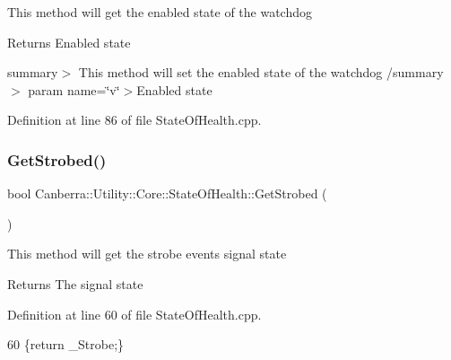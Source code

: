 This method will get the enabled state of the watchdog 

\begin{DoxyReturn}{Returns}
Enabled state
\end{DoxyReturn}
summary$>$ This method will set the enabled state of the watchdog /summary$>$ param name=\char`\"{}v\char`\"{}$>$Enabled state

Definition at line 86 of file State\+Of\+Health.\+cpp.

\mbox{\label{class_canberra_1_1_utility_1_1_core_1_1_state_of_health_a7cb904e2fe8ecb7ff16760a0abb9da46_a7cb904e2fe8ecb7ff16760a0abb9da46}} 
\subsubsection{\texorpdfstring{Get\+Strobed()}{GetStrobed()}}
{\footnotesize\ttfamily bool Canberra\+::\+Utility\+::\+Core\+::\+State\+Of\+Health\+::\+Get\+Strobed (\begin{DoxyParamCaption}{ }\end{DoxyParamCaption})}



This method will get the strobe events signal state 

\begin{DoxyReturn}{Returns}
The signal state
\end{DoxyReturn}


Definition at line 60 of file State\+Of\+Health.\+cpp.


\begin{DoxyCode}
60 \{\textcolor{keywordflow}{return} \_Strobe;\}
\end{DoxyCode}
\mbox{\label{class_canberra_1_1_utility_1_1_core_1_1_state_of_health_a5c707d8203b969f0130c64850a31d09d_a5c707d8203b969f0130c64850a31d09d}} 
